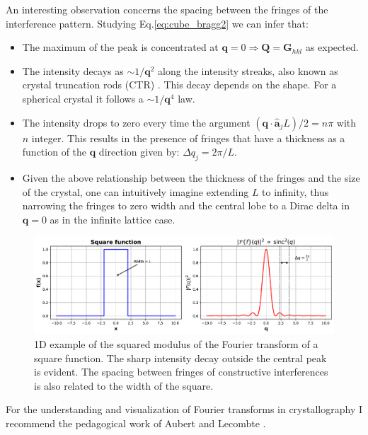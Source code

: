 An interesting observation concerns the spacing between the fringes of the interference pattern. Studying Eq.\ref{eq:cube_bragg2}
we can infer that:  

\begin{itemize}
    \item The maximum of the peak is concentrated at $\mathbf q = 0  \Rightarrow \mathbf Q = \mathbf{G}_{hkl}$ as expected. 
    \item The intensity decays as $ \sim 1/\mathbf{q}^2$ along the intensity streaks, also known as crystal truncation 
    rods (CTR) \cite{Robinson1986CTR}. This decay depends on the shape. For a spherical crystal it follows a $ \sim 1/\mathbf{q}^4$ law.
    \item The 
    intensity drops to zero every time the argument $(\mathbf{q} \cdot \mathbf{\hat{a}}_j L) /2 = n\pi$ with $n$ integer. 
    This results in the presence of fringes that have a thickness as a function of the $\mathbf q$ direction given by:
    $\Delta q_j = 2\pi/L$. 
    \item Given the above relationship between the thickness of the fringes and the size of the crystal, one can intuitively
    imagine extending $L$ to infinity, thus narrowing the fringes to zero width and the central lobe to a Dirac delta in $\mathbf{q} = 0$ 
    as in the infinite lattice case. 
\end{itemize}

\begin{figure}[H]
    \centering
    \includegraphics[width=\textwidth]{figures/Intro/square.pdf}
    \caption{1D example of the squared modulus of the Fourier transform of a square function. The sharp intensity decay 
     outside the central peak is evident. The spacing between fringes of constructive interferences is also related 
     to the width of the square.}
    \label{fig:square_ft}
\end{figure}

For the understanding and visualization of Fourier transforms in crystallography I recommend the pedagogical work of 
Aubert and Lecombte \cite{Aubert:kk5014}.

